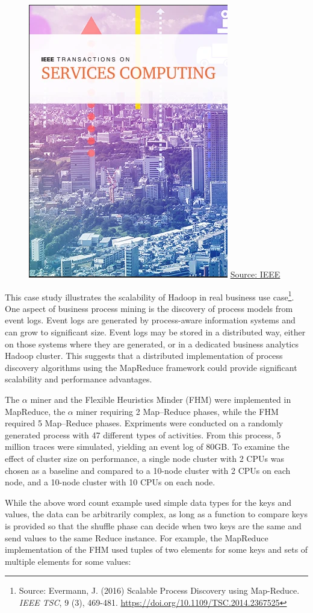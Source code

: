 \begin{figure}
\begin{center}
\includegraphics[width=.2\textwidth]{screen1.png}
\scriptsize \url{Source: IEEE}
\end{center}
\end{figure}
This case study illustrates the scalability of Hadoop in real business use case\footnote{Source: Evermann, J. (2016) Scalable Process Discovery using Map-Reduce. \emph{IEEE TSC}, 9 (3), 469-481. \url{https://doi.org/10.1109/TSC.2014.2367525}}. One aspect of business process mining is the discovery of process models from event logs. Event logs are generated by process-aware information systems and can grow to significant size. Event logs may be stored in a distributed way, either on those systems where they are generated, or in a dedicated business analytics Hadoop cluster. This suggests that a distributed implementation of process discovery algorithms using the MapReduce framework could provide significant scalability and performance advantages. 

The $\alpha$ miner and the Flexible Heuristics Minder (FHM) were implemented in MapReduce, the $\alpha$ miner requiring 2 Map--Reduce phases, while the FHM required 5 Map--Reduce phases. Expriments were conducted on a randomly generated process with 47 different types of activities. From this process, 5 million traces were simulated, yielding an event log of 80GB. To examine the effect of cluster size on performance, a single node cluster with 2 CPUs was chosen as a baseline and compared to a 10-node cluster with 2 CPUs on each node, and a 10-node cluster with 10 CPUs on each node. 

While the above word count example used simple data types for the keys and values, the data can be arbitrarily complex, as long as a function to compare keys is provided so that the shuffle phase can decide when two keys are the same and send values to the same Reduce instance. For example, the MapReduce implementation of the FHM used tuples of two elements for some keys and sets of multiple elements for some values:

